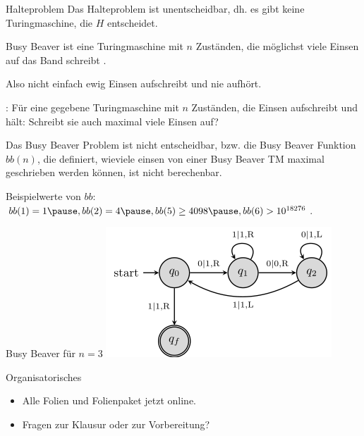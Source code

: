 \begin{frame}{Halteproblem}
	Das Halteproblem ist unentscheidbar\ip, dh. es gibt keine Turingmaschine, die $H$ entscheidet.
\end{frame}

\begin{frame}{Busy Beaver}
	 ist eine Turingmaschine mit $n$ Zuständen, die möglichst viele Einsen auf das Band schreibt .
	
	\begin{itemize}
		\pitem Also nicht einfach ewig Einsen aufschreibt und nie aufhört.
	\end{itemize}
	
	\bp
	
	: Für eine gegebene Turingmaschine mit $n$ Zuständen, die Einsen aufschreibt und hält: Schreibt sie auch maximal viele Einsen auf?
	
	\bp
	\vspace{.2cm}
	
	Das Busy Beaver Problem ist nicht entscheidbar, bzw. die Busy Beaver Funktion $bb(n)$, die definiert, wieviele einsen von einer Busy Beaver TM maximal geschrieben werden können, ist nicht berechenbar.
	
	\bp
	
	\vspace{.2cm}
	
	Beispielwerte von $bb$: $bb(1) = 1\ip, bb(2) = 4\ip, bb(5) \geq 4098\ip, bb(6) > 10^{18276}$.
\end{frame}

\begin{frame}{Busy Beaver für $n = 3$}
	\includegraphics[scale=0.8]{images/turingmaschine_bb.png}	
\end{frame}

\begin{frame}{Organisatorisches}
	\begin{itemize}
		\item Alle Folien und Folienpaket jetzt online.
		\item Fragen zur Klausur oder zur Vorbereitung?
	\end{itemize}
\end{frame}

